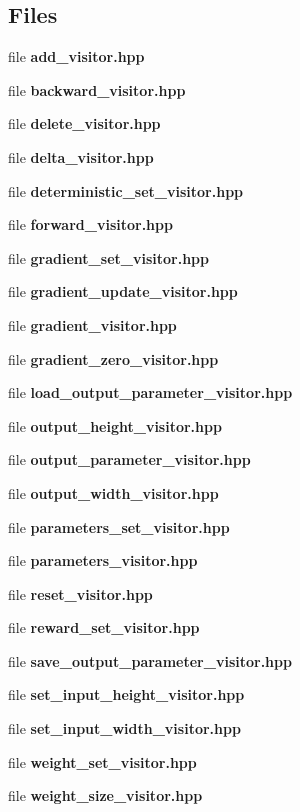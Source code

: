 \subsection*{Files}
\begin{DoxyCompactItemize}
\item 
file {\bf add\+\_\+visitor.\+hpp}
\item 
file {\bf backward\+\_\+visitor.\+hpp}
\item 
file {\bf delete\+\_\+visitor.\+hpp}
\item 
file {\bf delta\+\_\+visitor.\+hpp}
\item 
file {\bf deterministic\+\_\+set\+\_\+visitor.\+hpp}
\item 
file {\bf forward\+\_\+visitor.\+hpp}
\item 
file {\bf gradient\+\_\+set\+\_\+visitor.\+hpp}
\item 
file {\bf gradient\+\_\+update\+\_\+visitor.\+hpp}
\item 
file {\bf gradient\+\_\+visitor.\+hpp}
\item 
file {\bf gradient\+\_\+zero\+\_\+visitor.\+hpp}
\item 
file {\bf load\+\_\+output\+\_\+parameter\+\_\+visitor.\+hpp}
\item 
file {\bf output\+\_\+height\+\_\+visitor.\+hpp}
\item 
file {\bf output\+\_\+parameter\+\_\+visitor.\+hpp}
\item 
file {\bf output\+\_\+width\+\_\+visitor.\+hpp}
\item 
file {\bf parameters\+\_\+set\+\_\+visitor.\+hpp}
\item 
file {\bf parameters\+\_\+visitor.\+hpp}
\item 
file {\bf reset\+\_\+visitor.\+hpp}
\item 
file {\bf reward\+\_\+set\+\_\+visitor.\+hpp}
\item 
file {\bf save\+\_\+output\+\_\+parameter\+\_\+visitor.\+hpp}
\item 
file {\bf set\+\_\+input\+\_\+height\+\_\+visitor.\+hpp}
\item 
file {\bf set\+\_\+input\+\_\+width\+\_\+visitor.\+hpp}
\item 
file {\bf weight\+\_\+set\+\_\+visitor.\+hpp}
\item 
file {\bf weight\+\_\+size\+\_\+visitor.\+hpp}
\end{DoxyCompactItemize}
